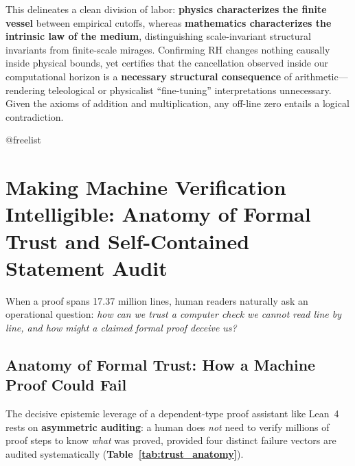 \documentclass[11pt,a4paper]{article}
\makeatletter
\providecommand{\FloatBarrier}{%
  \par
  \expandafter\ifx\csname @freelist\endcsname\relax\else
    \ifx\@deferlist\@empty\else
      \clearpage
    \fi
  \fi
}
\let\orig@section\section
\renewcommand{\section}{\FloatBarrier\orig@section}
\makeatother
\begin{document}
This delineates a clean division of labor: \textbf{physics characterizes the finite vessel} between empirical cutoffs, whereas \textbf{mathematics characterizes the intrinsic law of the medium}, distinguishing scale-invariant structural invariants from finite-scale mirages. Confirming RH changes nothing causally inside physical bounds, yet certifies that the cancellation observed inside our computational horizon is a \textbf{necessary structural consequence} of arithmetic---rendering teleological or physicalist ``fine-tuning'' interpretations unnecessary. Given the axioms of addition and multiplication, any off-line zero entails a logical contradiction.

\section{Making Machine Verification Intelligible: Anatomy of Formal Trust and Self-Contained Statement Audit}

When a proof spans 17.37 million lines, human readers naturally ask an operational question: \emph{how can we trust a computer check we cannot read line by line, and how might a claimed formal proof deceive us?}

\subsection{Anatomy of Formal Trust: How a Machine Proof Could Fail}

The decisive epistemic leverage of a dependent-type proof assistant like Lean~4 rests on \textbf{asymmetric auditing}: a human does \emph{not} need to verify millions of proof steps to know \emph{what} was proved, provided four distinct failure vectors are audited systematically (\textbf{Table~\ref{tab:trust_anatomy}}).
\end{document}
